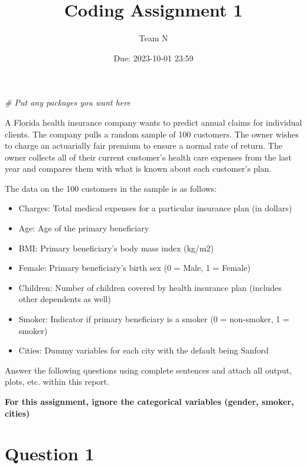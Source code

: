 \documentclass[
]{article}
\title{Coding Assignment 1}
\author{Team N}
\date{Due: 2023-10-01 23:59}
\newenvironment{Shaded}{\begin{snugshade}}{\end{snugshade}}
\newcommand{\CommentTok}[1]{\textcolor[rgb]{0.56,0.35,0.01}{\textit{#1}}}
\providecommand{\tightlist}{%
  \setlength{\itemsep}{0pt}\setlength{\parskip}{0pt}}
\begin{document}
\maketitle

{
\setcounter{tocdepth}{2}
\tableofcontents
}
\begin{Shaded}
\begin{Highlighting}[]
\CommentTok{\# Put any packages you want here}
\end{Highlighting}
\end{Shaded}

A Florida health insurance company wants to predict annual claims for
individual clients. The company pulls a random sample of 100 customers.
The owner wishes to charge an actuarially fair premium to ensure a
normal rate of return. The owner collects all of their current
customer's health care expenses from the last year and compares them
with what is known about each customer's plan.

The data on the 100 customers in the sample is as follows:

\begin{itemize}
\tightlist
\item
  Charges: Total medical expenses for a particular insurance plan (in
  dollars)
\item
  Age: Age of the primary beneficiary
\item
  BMI: Primary beneficiary's body mass index (kg/m2)
\item
  Female: Primary beneficiary's birth sex (0 = Male, 1 = Female)
\item
  Children: Number of children covered by health insurance plan
  (includes other dependents as well)
\item
  Smoker: Indicator if primary beneficiary is a smoker (0 = non-smoker,
  1 = smoker)
\item
  Cities: Dummy variables for each city with the default being Sanford
\end{itemize}

Answer the following questions using complete sentences and attach all
output, plots, etc. within this report.

\textbf{For this assignment, ignore the categorical variables (gender,
smoker, cities)}

\hypertarget{question-1}{%
\section{Question 1}\label{question-1}}
\end{document}
